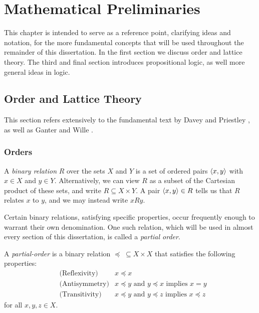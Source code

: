 \chapter{Mathematical Preliminaries}
\label{chapter:mathematical-preliminaries}

This chapter is intended to serve as a reference point, clarifying ideas and notation, for the more fundamental concepts that will be used throughout the remainder of this dissertation. In the first section we discuss order and lattice theory. The third and final section introduces propositional logic, as well more general ideas in logic.

\section{Order and Lattice Theory}
\label{section:order-theory}

This section refers extensively to the fundamental text by Davey and Priestley \cite{Davey_Priestley_2002}, as well as Ganter and Wille \cite{ganter1999formal}.

\subsection{Orders}
\label{subsection:orders}

A \textit{binary relation}  $R$ over the sets $X$ and $Y$ is a set of ordered pairs $\langle x,y \rangle$ with $x \in X$ and $y \in Y$. Alternatively, we can view $R$ as a subset of the Cartesian product of these sets, and write $R \subseteq X \times Y$. A pair $\langle x,y \rangle \in R$ tells us that $R$ relates $x$ to $y$, and we may instead write $xRy$.


Certain binary relations, satisfying specific properties, occur frequently enough to warrant their own denomination. One such relation, which will be used in almost every section of this dissertation, is called a \textit{partial order}.

\begin{definition}
  \label{definition:partial-order}
  A \textit{partial-order}  is a binary relation $\preceq \; \subseteq X \times X$ that satisfies the following properties:
  \begin{align}
    & \text{(Reflexivity)} & x \preceq x \\
    & \text{(Antisymmetry)} & x \preceq y \text{ and } y \preceq x \text{ implies } x = y \\
    & \text{(Transitivity)} & x \preceq y \text{ and } y \preceq z \text{ implies } x \preceq z
  \end{align}
  for all $x,y,z \in X$.
\end{definition}

